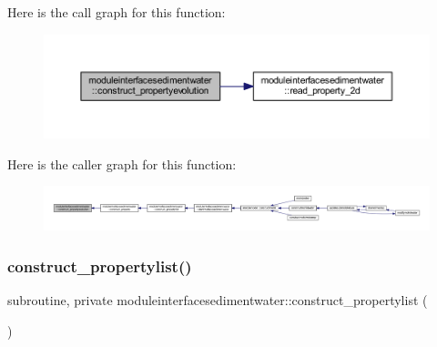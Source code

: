 Here is the call graph for this function\+:\nopagebreak
\begin{figure}[H]
\begin{center}
\leavevmode
\includegraphics[width=350pt]{namespacemoduleinterfacesedimentwater_a6336ff1fc78b8fe728b00770c5b311b0_cgraph}
\end{center}
\end{figure}
Here is the caller graph for this function\+:\nopagebreak
\begin{figure}[H]
\begin{center}
\leavevmode
\includegraphics[width=350pt]{namespacemoduleinterfacesedimentwater_a6336ff1fc78b8fe728b00770c5b311b0_icgraph}
\end{center}
\end{figure}
\mbox{\label{namespacemoduleinterfacesedimentwater_a1db436f609ed9890367a1345dba195c0}} 
\subsubsection{\texorpdfstring{construct\+\_\+propertylist()}{construct\_propertylist()}}
{\footnotesize\ttfamily subroutine, private moduleinterfacesedimentwater\+::construct\+\_\+propertylist (\begin{DoxyParamCaption}{ }\end{DoxyParamCaption})\hspace{0.3cm}{\ttfamily [private]}}

